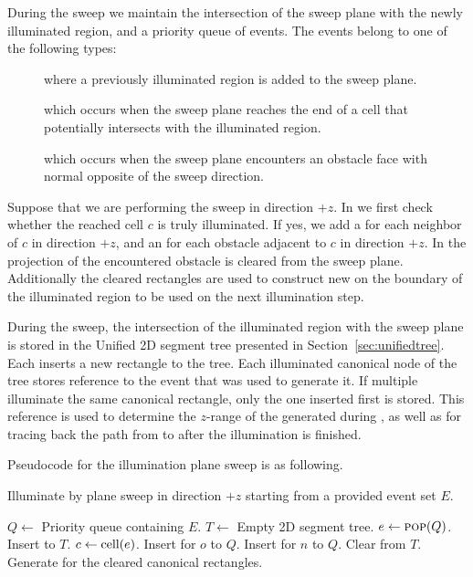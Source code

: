 \documentclass[english,gradu]{tktltiki2018}
\begin{document}
During the sweep we maintain the intersection of the sweep plane with the newly illuminated region, and a priority queue of events.
The events belong to one of the following types:

\begin{description}
\item[\addE] where a previously illuminated region is added to the sweep plane.
\item[\cellE] which occurs when the sweep plane reaches the end of a cell that potentially intersects with the illuminated region.
\item[\obsE] which occurs when the sweep plane encounters an obstacle face with normal opposite of the sweep direction.
\end{description}

Suppose that we are performing the sweep in direction $+z$.
In \cellE we first check whether the reached cell $c$ is truly illuminated.
If yes, we add a \cellE for each neighbor of $c$ in direction $+z$, and an \obsE for each obstacle adjacent to $c$ in direction $+z$.
In \obsE the projection of the encountered obstacle is cleared from the sweep plane.
Additionally the cleared rectangles are used to construct new \addEs on the boundary of the illuminated region to be used on the next illumination step.

During the sweep, the intersection of the illuminated region with the sweep plane is stored in the Unified 2D segment tree presented in Section~\ref{sec:unifiedtree}.
Each \addE inserts a new rectangle to the tree.
Each illuminated canonical node of the tree stores reference to the event that was used to generate it.
If multiple \addEs illuminate the same canonical rectangle, only the one inserted first is stored.
This reference is used to determine the $z$-range of the \addEs generated during \obsE, as well as for tracing back the path from \ept to \spt after the illumination is finished.

Pseudocode for the illumination plane sweep is as following.

\begin{alg}\label{alg:sweep3d}
Illuminate by plane sweep in direction $+z$ starting from a provided event set $E$.
\begin{algorithmic}
\State $Q\gets$ Priority queue containing $E$.
\State $T\gets$ Empty 2D segment tree.
	\State $e\gets\textsc{pop}(Q)$.
		\State Insert  to $T$.
			\State $c\gets\text{cell}(e)$.
				\State Insert \obsE for $o$ to $Q$.
			\EndFor
				\State Insert \cellE for $n$ to $Q$.
			\EndFor
		\EndIf
		\State Clear  from $T$.
		\State Generate \addEs for the cleared canonical rectangles.
	\EndIf
\EndWhile
\end{algorithmic}
\end{alg}
\end{document}
